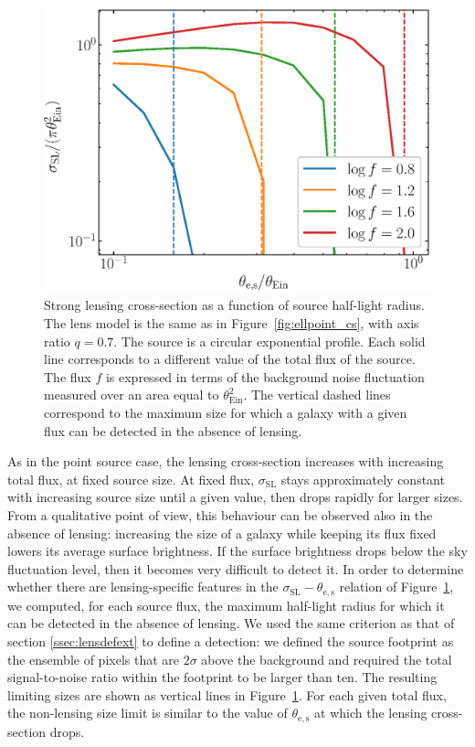 \documentclass{aa}
\def\tein{\theta_{\mathrm{Ein}}}
\def\crosssect{\sigma_\mathrm{{SL}}}
\def\Fref#1{Figure~\ref{#1}\xspace}
\begin{document}
\begin{figure}
\includegraphics[width=\columnwidth]{ell_ext_cs.eps}
\caption{
Strong lensing cross-section as a function of source half-light radius.
The lens model is the same as in \Fref{fig:ellpoint_cs}, with axis ratio $q=0.7$. The source is a circular exponential profile.
Each solid line corresponds to a different value of the total flux of the source. The flux $f$ is expressed in terms of the background noise fluctuation measured over an area equal to $\tein^2$.
The vertical dashed lines correspond to the maximum size for which a galaxy with a given flux can be detected in the absence of lensing.
\label{fig:extcs}
}
\end{figure}

As in the point source case, the lensing cross-section increases with increasing total flux, at fixed source size.
At fixed flux, $\crosssect$ stays approximately constant with increasing source size until a given value, then drops rapidly for larger sizes.
From a qualitative point of view, this behaviour can be observed also in the absence of lensing: increasing the size of a galaxy while keeping its flux fixed lowers its average surface brightness. If the surface brightness drops below the sky fluctuation level, then it becomes very difficult to detect it.
In order to determine whether there are lensing-specific features in the $\crosssect-\theta_{\mathrm{e,s}}$ relation of \Fref{fig:extcs}, we computed, for each source flux, the maximum half-light radius for which it can be detected in the absence of lensing.
We used the same criterion as that of section \ref{ssec:lensdefext} to define a detection: we defined the source footprint as the ensemble of pixels that are $2\sigma$ above the background and required the total signal-to-noise ratio within the footprint to be larger than ten.
The resulting limiting sizes are shown as vertical lines in \Fref{fig:extcs}. For each given total flux, the non-lensing size limit is similar to the value of $\theta_{\mathrm{e,s}}$ at which the lensing cross-section drops.
\end{document}
